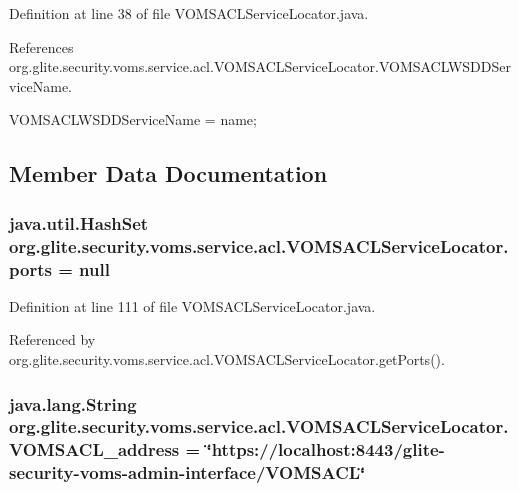 Definition at line 38 of file VOMSACLServiceLocator.java.



References org.glite.security.voms.service.acl.VOMSACLServiceLocator.VOMSACLWSDDServiceName.


\begin{DoxyCode}
                                                                 {
        VOMSACLWSDDServiceName = name;
    }
\end{DoxyCode}


\subsection{Member Data Documentation}
\hypertarget{classorg_1_1glite_1_1security_1_1voms_1_1service_1_1acl_1_1VOMSACLServiceLocator_ac36bebd7d5a6317b41068128e9b8686d}{
\subsubsection[{ports}]{\setlength{\rightskip}{0pt plus 5cm}java.util.HashSet {\bf org.glite.security.voms.service.acl.VOMSACLServiceLocator.ports} = null}}
\label{classorg_1_1glite_1_1security_1_1voms_1_1service_1_1acl_1_1VOMSACLServiceLocator_ac36bebd7d5a6317b41068128e9b8686d}


Definition at line 111 of file VOMSACLServiceLocator.java.



Referenced by org.glite.security.voms.service.acl.VOMSACLServiceLocator.getPorts().

\hypertarget{classorg_1_1glite_1_1security_1_1voms_1_1service_1_1acl_1_1VOMSACLServiceLocator_a9f9c7747368d8ca7660a6e8344e992a6}{
\subsubsection[{VOMSACL\_\-address}]{\setlength{\rightskip}{0pt plus 5cm}java.lang.String {\bf org.glite.security.voms.service.acl.VOMSACLServiceLocator.VOMSACL\_\-address} = \char`\"{}https://localhost:8443/glite-\/security-\/voms-\/admin-\/interface/{\bf VOMSACL}\char`\"{}}}
\label{classorg_1_1glite_1_1security_1_1voms_1_1service_1_1acl_1_1VOMSACLServiceLocator_a9f9c7747368d8ca7660a6e8344e992a6}


